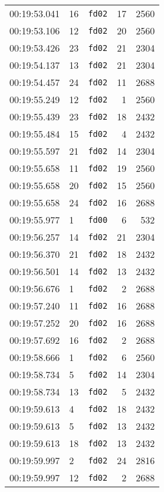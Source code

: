 \documentclass{article}
\begin{document}
\begin{longtable}{lllrr}
00:19:53.041 & 16 & \texttt{fd02} & 17 & 2560 \\
00:19:53.106 & 12 & \texttt{fd02} & 20 & 2560 \\
00:19:53.426 & 23 & \texttt{fd02} & 21 & 2304 \\
00:19:54.137 & 13 & \texttt{fd02} & 21 & 2304 \\
00:19:54.457 & 24 & \texttt{fd02} & 11 & 2688 \\
00:19:55.249 & 12 & \texttt{fd02} & 1 & 2560 \\
00:19:55.439 & 23 & \texttt{fd02} & 18 & 2432 \\
00:19:55.484 & 15 & \texttt{fd02} & 4 & 2432 \\
00:19:55.597 & 21 & \texttt{fd02} & 14 & 2304 \\
00:19:55.658 & 11 & \texttt{fd02} & 19 & 2560 \\
00:19:55.658 & 20 & \texttt{fd02} & 15 & 2560 \\
00:19:55.658 & 24 & \texttt{fd02} & 16 & 2688 \\
00:19:55.977 & 1 & \texttt{fd00} & 6 & 532 \\
00:19:56.257 & 14 & \texttt{fd02} & 21 & 2304 \\
00:19:56.370 & 21 & \texttt{fd02} & 18 & 2432 \\
00:19:56.501 & 14 & \texttt{fd02} & 13 & 2432 \\
00:19:56.676 & 1 & \texttt{fd02} & 2 & 2688 \\
00:19:57.240 & 11 & \texttt{fd02} & 16 & 2688 \\
00:19:57.252 & 20 & \texttt{fd02} & 16 & 2688 \\
00:19:57.692 & 16 & \texttt{fd02} & 2 & 2688 \\
00:19:58.666 & 1 & \texttt{fd02} & 6 & 2560 \\
00:19:58.734 & 5 & \texttt{fd02} & 14 & 2304 \\
00:19:58.734 & 13 & \texttt{fd02} & 5 & 2432 \\
00:19:59.613 & 4 & \texttt{fd02} & 18 & 2432 \\
00:19:59.613 & 5 & \texttt{fd02} & 13 & 2432 \\
00:19:59.613 & 18 & \texttt{fd02} & 13 & 2432 \\
00:19:59.997 & 2 & \texttt{fd02} & 24 & 2816 \\
00:19:59.997 & 12 & \texttt{fd02} & 2 & 2688 \\
\end{longtable}
\end{document}
